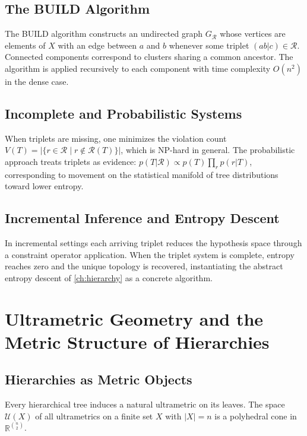 \documentclass[12pt,a4paper,oneside]{book}
\numberwithin{equation}{chapter}
\theoremstyle{plain}
\theoremstyle{definition}
\theoremstyle{remark}
\begin{document}
\section{The BUILD Algorithm}

The BUILD algorithm \cite{aho1981inferring} constructs an undirected
graph $G_\mathcal{R}$ whose vertices are elements of $X$ with an edge
between $a$ and $b$ whenever some triplet $(ab|c) \in \mathcal{R}$.
Connected components correspond to clusters sharing a common ancestor.
The algorithm is applied recursively to each component with time
complexity $O(n^2)$ in the dense case.

\section{Incomplete and Probabilistic Systems}

When triplets are missing, one minimizes the violation count
$V(T) = |\{r \in \mathcal{R} \mid r \notin \mathcal{R}(T)\}|$,
which is NP-hard in general. The probabilistic approach treats
triplets as evidence: $p(T|\mathcal{R}) \propto p(T)\prod_r p(r|T)$,
corresponding to movement on the statistical manifold of tree
distributions toward lower entropy.

\section{Incremental Inference and Entropy Descent}

In incremental settings each arriving triplet reduces the hypothesis
space through a constraint operator application. When the triplet
system is complete, entropy reaches zero and the unique topology is
recovered, instantiating the abstract entropy descent of
\cref{ch:hierarchy} as a concrete algorithm.


\chapter[Ultrametric Geometry]{Ultrametric Geometry and the Metric Structure of Hierarchies}
\label{ch:ultrametric}

\section{Hierarchies as Metric Objects}

Every hierarchical tree induces a natural ultrametric on its leaves.
The space $\mathcal{U}(X)$ of all ultrametrics on a finite set $X$
with $|X| = n$ is a polyhedral cone in $\mathbb{R}^{\binom{n}{2}}$.
\end{document}
